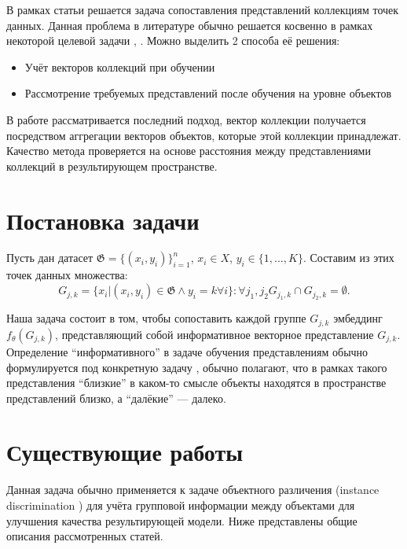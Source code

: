\documentclass{article}
\begin{document}
В рамках статьи решается задача сопоставления представлений коллекциям точек данных. Данная проблема в литературе обычно решается косвенно в рамках некоторой целевой задачи \cite{GroupFace}, \cite{Pang2022UnsupervisedVR}. Можно выделить 2 способа её решения:

\begin{itemize}
    \item Учёт векторов коллекций при обучении \cite{Pang2022UnsupervisedVR}
    \item Рассмотрение требуемых представлений после обучения на уровне объектов \cite{SiameseNetworks}
\end{itemize}

В работе рассматривается последний подход, вектор коллекции получается посредством аггрегации векторов объектов, которые этой коллекции принадлежат. Качество метода проверяется на основе расстояния между представлениями коллекций в результирующем пространстве.

\section{Постановка задачи}

Пусть дан датасет $\mathfrak{G} = \{(x_i, y_i)\}_{i = 1}^{n}$, $x_i \in X$, $y_i \in \{1, ..., K\}$. Составим из этих точек данных множества: \\
        $$G_{j, k} = \{x_i | (x_i, y_i) \in \mathfrak{G} \wedge y_i = k \forall i \} : \forall j_1, j_2 G_{j_1, k} \cap G_{j_2, k} = \emptyset.$$
        
Наша задача состоит в том, чтобы сопоставить каждой группе $G_{j, k}$ эмбеддинг $f_{\theta}(G_{j, k})$, представляющий собой информативное векторное представление $G_{j, k}$. Определение ``информативного'' в задаче обучения представлениям обычно формулируется под конкретную задачу \cite{Bengio2012RepresentationLA}, обычно полагают, что в рамках такого представления ``близкие'' в каком-то смысле объекты находятся в пространстве представлений близко, а ``далёкие'' --- далеко.

\section{Существующие работы}

Данная задача обычно применяется к задаче объектного различения (instance discrimination \cite{GroupFace}) для учёта групповой информации между объектами для улучшения качества результирующей модели. Ниже представлены общие описания рассмотренных статей.
\end{document}

